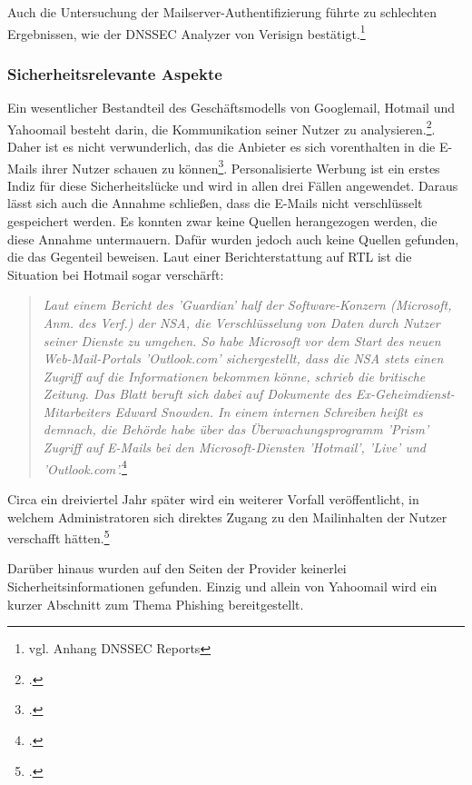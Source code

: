 \documentclass  [paper=a4,
				fontsize=12pt,
				listof=totoc,
				bibliography=totoc
				]{scrreprt}
\begin{document}
			Auch die Untersuchung der Mailserver-Authentifizierung führte zu schlechten Ergebnissen, wie der \ac{DNSSEC} Analyzer von Verisign bestätigt.\footnote{vgl. Anhang DNSSEC Reports} 
		
		
			\subsubsection{Sicherheitsrelevante Aspekte}
			Ein wesentlicher Bestandteil des Geschäftsmodells von Googlemail, Hotmail und Yahoomail besteht darin, die Kommunikation seiner Nutzer zu analysieren.\footcite[Vgl.][]{Kirsch}. Daher ist es nicht verwunderlich, das die Anbieter es sich vorenthalten in die E-Mails ihrer Nutzer schauen zu können\footcite[Vgl.][]{Schwan}. Personalisierte Werbung ist ein erstes Indiz für diese Sicherheitslücke und wird in allen drei Fällen angewendet. Daraus lässt sich auch die Annahme schließen, dass die E-Mails nicht verschlüsselt gespeichert werden. Es konnten zwar keine Quellen herangezogen werden, die diese Annahme untermauern. Dafür wurden jedoch auch keine Quellen gefunden, die das Gegenteil beweisen.
			Laut einer Berichterstattung auf RTL ist die Situation bei Hotmail sogar verschärft:
			\begin{quote}

			\textit{ Laut einem Bericht des 'Guardian' half der Software-Konzern (Microsoft, Anm. des Verf.) der NSA, die Verschlüsselung von Daten durch Nutzer seiner Dienste zu umgehen. So habe Microsoft vor dem Start des neuen Web-Mail-Portals 'Outlook.com' sichergestellt, dass die NSA stets einen Zugriff auf die Informationen bekommen könne, schrieb die britische Zeitung. Das Blatt beruft sich dabei auf Dokumente des Ex-Geheimdienst- Mitarbeiters Edward Snowden. In einem internen Schreiben heißt es demnach, die Behörde habe über das Überwachungsprogramm 'Prism' Zugriff auf E-Mails bei den Microsoft-Diensten 'Hotmail', 'Live' und 'Outlook.com'.}\footcite[Vgl.][]{Guardian}
			\end{quote}  
			Circa ein dreiviertel Jahr später wird ein weiterer Vorfall veröffentlicht, in welchem Administratoren sich direktes Zugang zu den Mailinhalten der Nutzer verschafft hätten.\footcite[Vgl.][]{Mailbox2014Microsoft}
			\medskip
			
			Darüber hinaus wurden auf den Seiten der Provider keinerlei Sicherheitsinformationen gefunden. Einzig und allein von Yahoomail wird ein kurzer Abschnitt zum Thema Phishing bereitgestellt.
			
\end{document}
